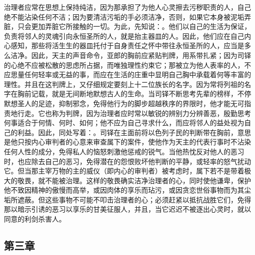 治理者应常在思想上保持纯洁，因为那承担了为他人心灵擦去污秽职责的人，自己绝不能沾染任何不洁；因为要清洁污垢的手必须洁净，否则，如果它本身被泥垢弄脏，只会更加弄脏它所接触的一切。为此，先知说：。他们以自己的生活为保证，负责将邻人的灵魂引向永恒圣所的人，就是抬主器皿的人。因此，他们应在自己内心感知，那些将活生生的器皿托付于自身责任之怀中带往永恒圣所的人，应当是多么洁净。因此，天主的声音命令，亚郎的胸前应紧贴判牌，用系带扎紧；因为司铎的心绝不应被松散的思虑所占据，而唯独理性约束它；那被立为他人表率的人，不应思量任何轻率或无益的事，而应在生活的庄重中显明自己胸中承载着何等丰富的理性。并且在这判牌上，又仔细规定要刻上十二位族长的名字。因为常将列祖的名字在胸前记载，就是无间断地默想古人的生命。当司铎不断思考先辈的榜样，不停默想圣人的足迹，抑制邪念，免得他行为的脚步超越秩序的界限时，他才能无可指责地行走。它也称为判牌，因为治理者应时常以敏锐的辨别力分辨善恶，殷勤思考何事适合于何情、何时、如何；他不应为自己寻求什么，而应将邻人的益处视为自己的利益。因此，同处写着：。司铎在主面前将以色列子民的判断带在胸前，意思是他只按内心审判者的心意来审查属下的案件，使他作为天主的代表行事时不沾染任何人性的成分，免得私人的恼怒刺激他惩戒的锐气。当他热忱反对他人的恶习时，也应除去自己的恶习，免得潜在的怨恨败坏他判断的平静，或轻率的怒气扰动它。但当那主宰万物的主的威仪（即内心的审判者）被考虑时，属下若不是带着极大的敬畏，就不能被治理。这样的敬畏确实洁净治理者的心，同时使他谦卑，保护他不致因精神的傲慢而高举，或因肉体的享乐而玷污，或因贪恋世俗事物而为其尘垢所遮蔽。但这些事物不可能不叩击治理者的心；必须赶紧以抵抗战胜它们，免得那以暗示引诱的恶习以享乐的甘美征服人，并且，当它迟迟不被逐出心灵时，就以同意的利剑杀害人。\par


\subsection{第三章}

\par

